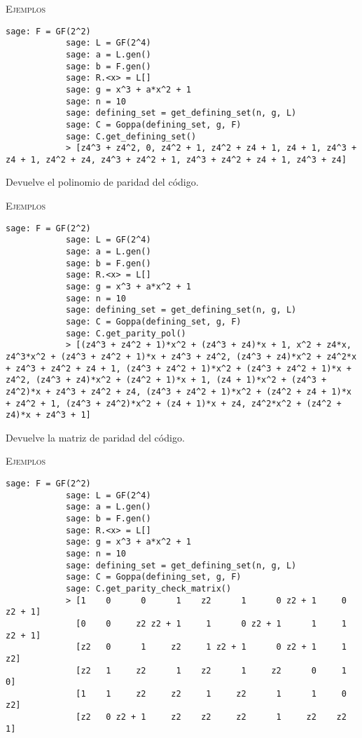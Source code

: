 \begin{description}[leftmargin=1em, font=\normalfont\ttfamily, style=nextline]
\begin{description}[font=\ttfamily, style=nextline]
        \textsc{Ejemplos}
        \begin{lstlisting}[gobble=4]
            sage: F = GF(2^2)
            sage: L = GF(2^4)
            sage: a = L.gen()
            sage: b = F.gen()
            sage: R.<x> = L[]
            sage: g = x^3 + a*x^2 + 1
            sage: n = 10
            sage: defining_set = get_defining_set(n, g, L)
            sage: C = Goppa(defining_set, g, F)
            sage: C.get_defining_set()
            > [z4^3 + z4^2, 0, z4^2 + 1, z4^2 + z4 + 1, z4 + 1, z4^3 + z4 + 1, z4^2 + z4, z4^3 + z4^2 + 1, z4^3 + z4^2 + z4 + 1, z4^3 + z4]
        \end{lstlisting}

        \item[get\_parity\_pol(self)] Devuelve el polinomio de paridad del código.

        \textsc{Ejemplos}
        \begin{lstlisting}[gobble=4]
            sage: F = GF(2^2)
            sage: L = GF(2^4)
            sage: a = L.gen()
            sage: b = F.gen()
            sage: R.<x> = L[]
            sage: g = x^3 + a*x^2 + 1
            sage: n = 10
            sage: defining_set = get_defining_set(n, g, L)
            sage: C = Goppa(defining_set, g, F)
            sage: C.get_parity_pol()
            > [(z4^3 + z4^2 + 1)*x^2 + (z4^3 + z4)*x + 1, x^2 + z4*x, z4^3*x^2 + (z4^3 + z4^2 + 1)*x + z4^3 + z4^2, (z4^3 + z4)*x^2 + z4^2*x + z4^3 + z4^2 + z4 + 1, (z4^3 + z4^2 + 1)*x^2 + (z4^3 + z4^2 + 1)*x + z4^2, (z4^3 + z4)*x^2 + (z4^2 + 1)*x + 1, (z4 + 1)*x^2 + (z4^3 + z4^2)*x + z4^3 + z4^2 + z4, (z4^3 + z4^2 + 1)*x^2 + (z4^2 + z4 + 1)*x + z4^2 + 1, (z4^3 + z4^2)*x^2 + (z4 + 1)*x + z4, z4^2*x^2 + (z4^2 + z4)*x + z4^3 + 1]
        \end{lstlisting}

        \item[get\_parity\_check\_matrix(self)] Devuelve la matriz de paridad del código.

        \textsc{Ejemplos}
        \begin{lstlisting}[gobble=4]
            sage: F = GF(2^2)
            sage: L = GF(2^4)
            sage: a = L.gen()
            sage: b = F.gen()
            sage: R.<x> = L[]
            sage: g = x^3 + a*x^2 + 1
            sage: n = 10
            sage: defining_set = get_defining_set(n, g, L)
            sage: C = Goppa(defining_set, g, F)
            sage: C.get_parity_check_matrix()
            > [1    0      0      1    z2      1      0 z2 + 1     0 z2 + 1]
              [0    0     z2 z2 + 1     1      0 z2 + 1      1     1 z2 + 1]
              [z2   0      1     z2     1 z2 + 1      0 z2 + 1     1     z2]
              [z2   1     z2      1    z2      1     z2      0     1      0]
              [1    1     z2     z2     1     z2      1      1     0     z2]
              [z2   0 z2 + 1     z2    z2     z2      1     z2    z2      1]
        \end{lstlisting}


\end{description}
\end{description}
